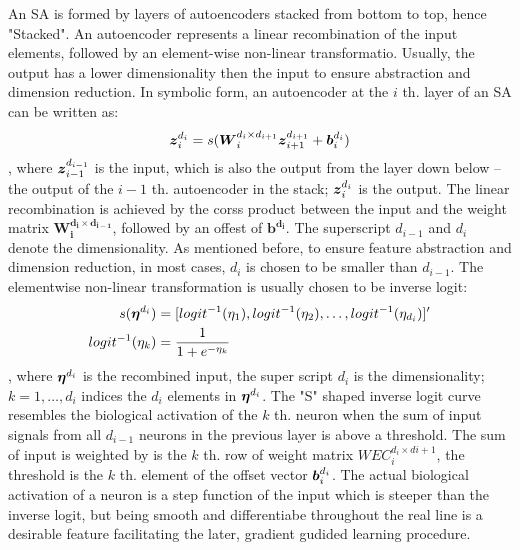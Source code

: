 An SA is formed by layers of autoencoders stacked from bottom to top, hence "Stacked". An autoencoder represents a linear recombination of the input elements, followed by an element-wise non-linear transformatio. Usually, the output has a lower dimensionality then the input to ensure abstraction and dimension reduction. In symbolic form, an autoencoder at the $i$ th. layer of an SA can be written as:
\begin{equation} \label{eq:AE}
  \begin{split}
    \boldsymbol{z}_i^{d_i}   &= s(\boldsymbol{W}_i^{d_i \times d_{i+1}} \boldsymbol{z}_{i+1}^{d_{i+1}} + \boldsymbol{b}_i^{d_i}) \\
  \end{split}
\end{equation},
where $\boldsymbol{z}_{i-1}^{d_{i-1}}$ is the input, which is also the output from the layer down below -- the output of the $i-1$ th. autoencoder in the stack; $\boldsymbol{z}_i^{d_i}$ is the output. The linear recombination is achieved by the corss product between the input and the weight matrix $\boldsymbol{W_i^{d_i\times d_{i-1}}}$, followed by an offest of $\boldsymbol{b^{d_i}}$. The superscript $d_{i-1}$ and $d_i$ denote the dimensionality. As mentioned before, to ensure feature abstraction and dimension reduction, in most cases, $d_i$ is chosen to be smaller than $d_{i-1}$. The elementwise non-linear transformation is usually chosen to be inverse logit:
\begin{equation} \label{eq:AE}
  \begin{split}
    s(\boldsymbol{\eta}^{d_i})     &= [logit^{-1}(\eta_1), logit^{-1}(\eta_2), \dots, logit^{-1}(\eta_{d_i})]^{\prime} \\
    logit^{-1}(\eta_k)  &= \frac{1}{1+e^{-\eta_k}}
  \end{split}
\end{equation},
where $\boldsymbol{\eta}^{d_i}$ is the recombined input, the super script $d_i$ is the dimensionality; $k = 1, \dots, d_i$ indices the $d_i$ elements in $\boldsymbol{\eta}^{d_i}$. The "S" shaped inverse logit curve resembles the biological activation of the $k$ th. neuron when the sum of input signals from all $d_{i-1}$ neurons in the previous layer is above a threshold. The sum of input is weighted by is the $k$ th. row of weight matrix $WEC_i^{d_i \times d{i+1}}$, the threshold is the $k$ th. element of the offset vector $\boldsymbol{b}_i^{d_i}$. The actual biological activation of a neuron is a step function of the input which is steeper than the inverse logit, but being smooth and differentiabe throughout the real line is a desirable feature facilitating the later, gradient gudided learning procedure.

